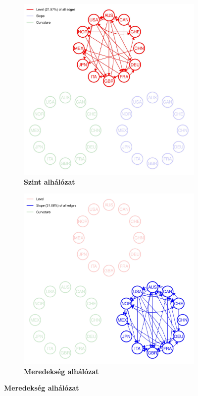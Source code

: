 \documentclass[12pt,bibliography=totoc]{article}
\begin{document}
\begin{figure}[H]
\caption{Összekötöttség az alhálózatokban}
  \begin{subfigure}[t]{.35\textwidth}
    \centering
    \includegraphics[width=\linewidth]{All_plot_onlylevel2004-07-01_2019-12-31_0.01-page-001}
    \caption{\textbf{Szint alhálózat}}
  \end{subfigure}
  \hfill
  \begin{subfigure}[t]{.35\textwidth}
    \centering
    \includegraphics[width=\linewidth]{All_plot_onlyslope_2004-07-01_2019-12-31_0.01-page-001}
    \caption{\textbf{Meredekség alhálózat}}
  \end{subfigure}


\end{figure}
\end{document}
